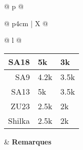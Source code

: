 \begin{adjustbox}{width={\textwidth},totalheight={\textheight},keepaspectratio}
{\begin{tabularx}{\textwidth}{ @{} p{\linewidth} @{} }
{\begin{tabularx}{\textwidth}{@{} p{4cm} | X @{}}
\begin{tabular}[t]{@{} l @{}}
{\begin{tabularx}{\linewidth}{@{} r X X @{}}
				SA18 & 5k & 3k\\[-3ex] \midrule
				SA9 & 4.2k & 3.5k\\[-3ex] \midrule
				SA13 & 5k & 3.5k\\[-3ex] \midrule
				ZU23 & 2.5k & 2k\\[-3ex] \midrule
				Shilka & 2.5k & 2k\\[-3ex] \midrule
			\end{tabularx}}
		\end{tabular} &
		\textbf{Remarques}\\
	\end{tabularx}}\\
\end{tabularx}
}
\end{adjustbox}%